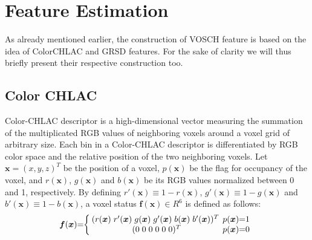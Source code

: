 \documentclass[conference]{sty/IEEEtran}
\begin{document}
\section{Feature Estimation}
\label{sec:features}
As already mentioned earlier, the construction of VOSCH feature is based on the idea of 
ColorCHLAC and GRSD features. For the sake of clarity we will thus briefly present
their respective construction too.

\subsection{Color CHLAC}
\label{sec:color_chlac}
Color-CHLAC descriptor is a high-dimensional vector measuring the summation of the 
multiplicated RGB values of neighboring voxels around a voxel grid of arbitrary size. 
Each bin in a Color-CHLAC descriptor is differentiated by RGB color space and the 
relative position of the two neighboring voxels. 
Let $\bm{x}=(x,y,z)^T$ be the position of a voxel, $p(\bm{x})$ be the flag for occupancy 
of the voxel, and $r(\bm{x})$, $g(\bm{x})$ and $b(\bm{x})$ be its RGB values normalized 
between 0 and 1, respectively.  By defining 
$r'(\bm{x}) \equiv 1 - r(\bm{x})$, $g'(\bm{x}) \equiv 1 - g(\bm{x})$ and $b'(\bm{x}) \equiv 1 - b(\bm{x})$, 
a voxel status $\bm{f}(\bm{x})\in R^6$ is defined as follows: 
\begin{eqnarray}
  \label{eq:voxel}
  \bm{f}({\bm x})\hspace{-1mm}=\hspace{-1mm}\left\{
  \begin{array}{cc}
    \hspace{-1mm}
    (r({\bm x})\hspace{1mm} r'({\bm x}) \hspace{1mm}g({\bm x}) \hspace{1mm}g'({\bm x}) \hspace{1mm}b({\bm x}) \hspace{1mm}b'({\bm x}))^T & \hspace{-2mm}p({\bm x})\hspace{-1mm}=\hspace{-1mm}1 \\
    (0\hspace{1mm}0\hspace{1mm}0\hspace{1mm}0\hspace{1mm}0\hspace{1mm}0)^T & \hspace{-2mm}p({\bm x})\hspace{-1mm}=\hspace{-1mm}0
  \end{array}\right.
\end{eqnarray}
\end{document}
